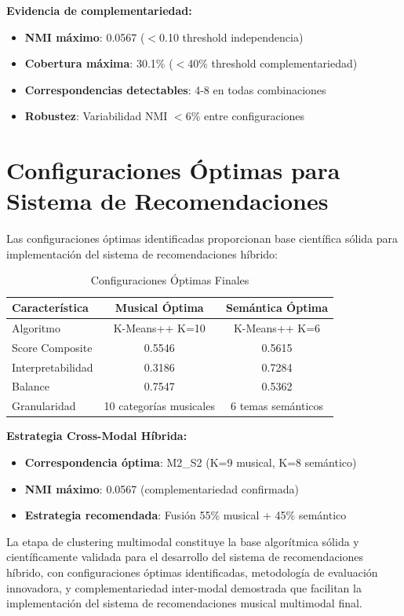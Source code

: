 \documentclass[12pt,a4paper]{report}
\begin{document}
\textbf{Evidencia de complementariedad:}
\begin{itemize}
    \item \textbf{NMI máximo}: 0.0567 ($<$0.10 threshold independencia)
    \item \textbf{Cobertura máxima}: 30.1\% ($<$40\% threshold complementariedad)
    \item \textbf{Correspondencias detectables}: 4-8 en todas combinaciones
    \item \textbf{Robustez}: Variabilidad NMI $<$6\% entre configuraciones
\end{itemize}

\section{Configuraciones Óptimas para Sistema de Recomendaciones}

Las configuraciones óptimas identificadas proporcionan base científica sólida para implementación del sistema de recomendaciones híbrido:

\begin{table}[H]
\centering
\caption{Configuraciones Óptimas Finales}
\begin{tabular}{|l|c|c|}
\hline
\textbf{Característica} & \textbf{Musical Óptima} & \textbf{Semántica Óptima} \\
\hline
Algoritmo & K-Means++ K=10 & K-Means++ K=6 \\
\hline
Score Composite & 0.5546 & 0.5615 \\
\hline
Interpretabilidad & 0.3186 & 0.7284 \\
\hline
Balance & 0.7547 & 0.5362 \\
\hline
Granularidad & 10 categorías musicales & 6 temas semánticos \\
\hline
\end{tabular}
\end{table}

\textbf{Estrategia Cross-Modal Híbrida:}
\begin{itemize}
    \item \textbf{Correspondencia óptima}: M2\_S2 (K=9 musical, K=8 semántico)
    \item \textbf{NMI máximo}: 0.0567 (complementariedad confirmada)
    \item \textbf{Estrategia recomendada}: Fusión 55\% musical + 45\% semántico
\end{itemize}

La etapa de clustering multimodal constituye la base algorítmica sólida y científicamente validada para el desarrollo del sistema de recomendaciones híbrido, con configuraciones óptimas identificadas, metodología de evaluación innovadora, y complementariedad inter-modal demostrada que facilitan la implementación del sistema de recomendaciones musical multimodal final.
\end{document}

